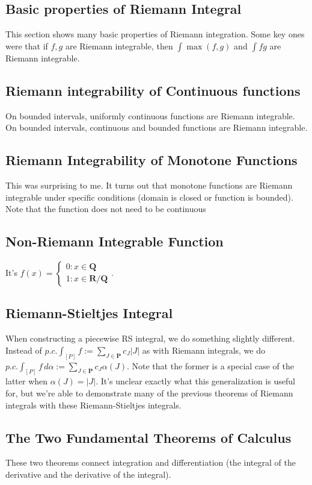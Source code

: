\documentclass[answers,12pt]{exam}
\begin{document}
\subsection{Basic properties of Riemann Integral}
This section shows many basic properties of Riemann integration.
Some key ones were that if $f,g$ are Riemann integrable, then $\int \max(f,g)$ and $\int fg$ are Riemann integrable.

\subsection{Riemann integrability of Continuous functions}
On bounded intervals, uniformly continuous functions are Riemann integrable.
On bounded intervals, continuous and bounded functions are Riemann integrable.

\subsection{Riemann Integrability of Monotone Functions}
This was surprising to me.
It turns out that monotone functions are Riemann integrable under specific conditions (domain is closed or function is bounded).
Note that the function does not need to be continuous

\subsection{Non-Riemann Integrable Function}
It's $f(x) = \begin{cases} 0: x \in \mathbf{Q} \\ 1: x \in \mathbf{R}/\mathbf{Q} \end{cases}$.

\subsection{Riemann-Stieltjes Integral}
When constructing a piecewise RS integral, we do something slightly different.
Instead of $p.c. \int_{[P]} f:= \sum_{J \in \mathbf{P}} c_J|J|$ as with Riemann integrals, we do $p.c. \int_{[P]} f\, d\alpha := \sum_{J \in \mathbf{P}} c_J \alpha(J)$.
Note that the former is a special case of the latter when $\alpha(J) = |J|$.
It's unclear exactly what this generalization is useful for, but we're able to demonstrate many of the previous theorems of Riemann integrals with these Riemann-Stieltjes integrals.

\subsection{The Two Fundamental Theorems of Calculus}
These two theorems connect integration and differentiation (the integral of the derivative and the derivative of the integral).
\end{document}
